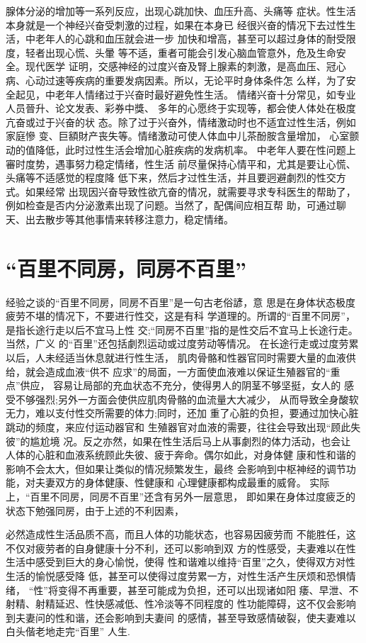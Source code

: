 \documentclass[12pt,UTF8]{ctexbook}
\begin{document}
腺体分泌的增加等一系列反应，出现心跳加快、血压升高、头痛等
症状。性生活本身就是一个神经兴奋受刺激的过程，如果在本身已
经很兴奋的情况下去过性生活，中老年人的心跳和血压就会进一步
加快和增高，甚至可以超过身体的耐受限度，轻者出现心慌、头暈
等不适，重者可能会引发心脑血管意外，危及生命安全。现代医学
证明，交感神经的过度兴奋及腎上腺素的刺激，是高血压、冠心
病、心动过速等疾病的重要发病因素。所以，无论平时身体条件怎
么样，为了安全起见，中老年人情绪过于兴奋时最好避免性生活。
情绪兴奋十分常见，如专业人员晉升、论文发表、彩券中獎、
多年的心愿终于实现等，都会使人体处在极度亢奋或过于兴奋的状
态。除了过于兴奋外，情绪激动时也不适宜过性生活，例如家庭慘
变、巨額財产丧失等。情绪激动可使人体血中儿茶酚胺含量增加，
心室颤动的值降低，此时过性生活会增加心脏疾病的发病机率。
中老年人要在性问题上審时度势，遇事努力稳定情绪，性生活
前尽量保持心情平和，尤其是要让心慌、头痛等不适感觉的程度降
低下来，然后才过性生活，并且要迥避劇烈的性交方式。如果经常
出现因兴奋导致性欲亢奋的情况，就需要寻求专科医生的帮助了，
例如检查是否内分泌激素出现了问题。当然了，配偶间应相互帮
助，可通过聊天、出去散步等其他事情来转移注意力，稳定情绪。

\section{“百里不同房，同房不百里”}

经验之谈的“百里不同房，同房不百里”是一句古老俗諺，意
思是在身体状态极度疲劳不堪的情况下，不要进行性交，这是有科
学道理的。所谓的“百里不同房”，是指长途行走以后不宜马上性
交;“同房不百里”指的是性交后不宜马上长途行走。当然，广义
的“百里”还包括劇烈运动或过度劳动等情况。
在长途行走或过度劳累以后，人未经适当休息就进行性生活，
肌肉骨骼和性器官同时需要大量的血液供给，就会造成血液“供不
应求”的局面，一方面使血液难以保证生殖器官的“重点”供应，
容易让局部的充血状态不充分，使得男人的阴茎不够坚挺，女人的
感受不够强烈;另外一方面会使供应肌肉骨骼的血流量大大减少，
从而导致全身酸软无力，难以支付性交所需要的体力;同时，还加
重了心脏的负担，要通过加快心脏跳动的频度，来应付运动器官和
生殖器官对血液的需要，往往会导致出现“顾此失彼”的尴尬境
况。反之亦然，如果在性生活后马上从事劇烈的体力活动，也会让
人体的心脏和血液系统顾此失彼、疲于奔命。偶尔如此，对身体健
康和性和谐的影响不会太大，但如果让类似的情况频繁发生，最终
会影响到中枢神经的调节功能，对夫妻双方的身体健康、性健康和
心理健康都构成最重的威脅。
实际上，“百里不同房，同房不百里”还含有另外一层意思，
即如果在身体过度疲乏的状态下勉强同房，由于上述的不利因素，

必然造成性生活品质不高，而且人体的功能状态，也容易因疲劳而
不能胜任，这不仅对疲劳者的自身健康十分不利，还可以影响到双
方的性感受，夫妻难以在性生活中感受到巨大的身心愉悦，使得
性和谐难以维持“百里”之久，使得双方对性生活的愉悦感受降
低，甚至可以使得过度劳累一方，对性生活产生厌烦和恐惧情绪，
“性”将变得不再重要，甚至可能成为负担，还可以出现诸如阳
痿、早泄、不射精、射精延迟、性快感减低、性冷淡等不同程度的
性功能障碍，这不仅会影响到夫妻问的性和谐，还会影响到夫妻间
的感情，甚至导致感情破裂，使夫妻难以白头偕老地走完“百里”
人生.
\end{document}
